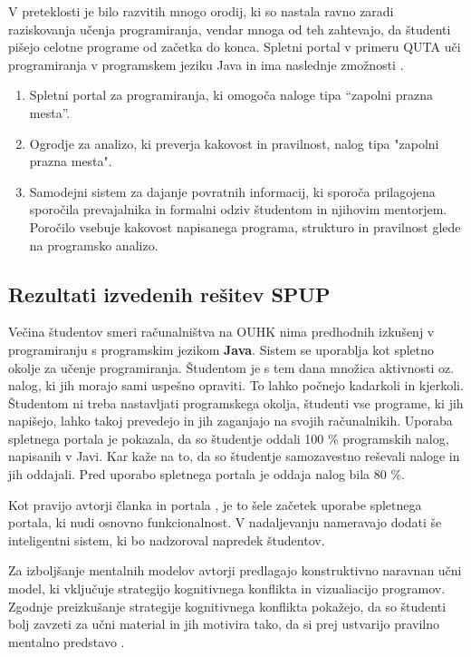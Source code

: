V preteklosti je bilo razvitih mnogo orodij, ki so nastala ravno zaradi
raziskovanja učenja programiranja, vendar mnoga od teh zahtevajo, da
študenti pišejo celotne programe od začetka do konca. Spletni portal
v primeru QUTA uči programiranja v programskem jeziku Java in ima
 naslednje zmožnosti \cite{thesisAWebP}.

\begin{enumerate}
\tightlist
\item Spletni portal za programiranja, ki omogoča naloge tipa ``zapolni
   prazna mesta''. %
 \item Ogrodje za analizo, ki preverja kakovost in pravilnost, nalog
   tipa "zapolni prazna mesta".
 \item  Samodejni sistem za dajanje povratnih informacij, ki sporoča
   prilagojena sporočila prevajalnika in formalni odziv študentom in
   njihovim mentorjem. Poročilo vsebuje kakovost napisanega programa,
   strukturo in pravilnost glede na programsko analizo.
\end{enumerate}

\subsection{Rezultati izvedenih rešitev SPUP}
\label{sec:rezultati_izvedenih_rešitev}

Večina študentov smeri računalništva na OUHK nima predhodnih izkušenj
v programiranju s programskim jezikom \textbf{Java}. Sistem se
uporablja kot spletno okolje za učenje programiranja. Študentom je s
tem dana množica aktivnosti oz. nalog, ki jih morajo sami uspešno
opraviti. To lahko počnejo kadarkoli in kjerkoli. Študentom ni
treba nastavljati programskega okolja, študenti vse programe, ki
jih napišejo, lahko takoj prevedejo in jih zaganjajo na svojih
računalnikih. Uporaba spletnega portala je pokazala, da so študentje
oddali 100 \% programskih nalog, napisanih v Javi. Kar kaže na to, da so
študentje samozavestno reševali naloge in jih oddajali. Pred uporabo
spletnega portala je oddaja nalog bila 80 \%.

Kot pravijo avtorji članka in portala \cite{ITaLCP_DistanceEdu}, je to
šele začetek uporabe spletnega portala, ki nudi osnovno
funkcionalnost. V nadaljevanju nameravajo dodati še inteligentni
sistem, ki bo nadzoroval napredek študentov.

Za izboljšanje mentalnih modelov avtorji predlagajo konstruktivno
naravnan učni model, ki vključuje strategijo kognitivnega konflikta in
vizualiacijo programov. Zgodnje preizkušanje strategije kognitivnega
konflikta pokažejo, da so študenti bolj zavzeti za učni material in jih
motivira tako, da si prej ustvarijo pravilno mentalno predstavo
\cite{mentalModels}.

